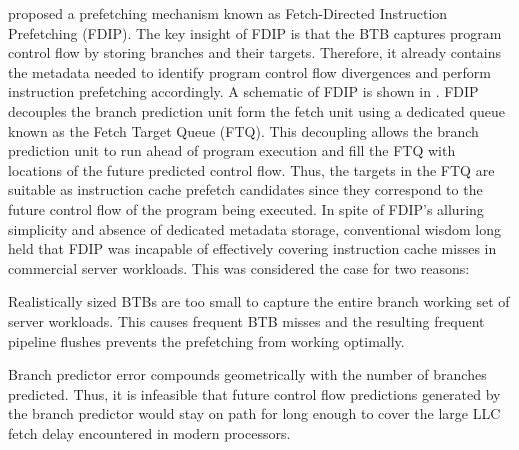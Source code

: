 \documentclass[../main.tex]{subfiles}
\begin{document}
\begin{refsection}
\textcite{reinman99_fetch_direc_instr_prefet} proposed a prefetching
mechanism known as Fetch-Directed Instruction Prefetching (FDIP). The
key insight of FDIP is that the BTB captures program control flow by
storing branches and their targets. Therefore, it already contains the
metadata needed to identify program control flow divergences and
perform instruction prefetching accordingly. A schematic of FDIP is
shown in . FDIP decouples the branch prediction unit
form the fetch unit using a dedicated queue known as the Fetch Target
Queue (FTQ). This decoupling allows the branch prediction unit to run
ahead of program execution and fill the FTQ with locations of the
future predicted control flow. Thus, the targets in the FTQ are
suitable as instruction cache prefetch candidates since they
correspond to the future control flow of the program being
executed. In spite of FDIP's alluring simplicity and absence of
dedicated metadata storage, conventional wisdom long held that FDIP
was incapable of effectively covering instruction cache misses in
commercial server workloads. This was considered the case for two
reasons: \begin{inparaenum}[1)] \item Realistically sized BTBs are too
  small to capture the entire branch working set of server
  workloads. This causes frequent BTB misses and the resulting
  frequent pipeline flushes prevents the prefetching from working
  optimally. \item Branch predictor error compounds geometrically with
  the number of branches predicted. Thus, it is infeasible that future
  control flow predictions generated by the branch predictor would
  stay on path for long enough to cover the large LLC fetch delay
  encountered in modern processors.
\end{inparaenum}



\end{refsection}
\end{document}
